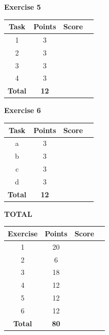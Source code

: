\documentclass [11pt, a4wide, twoside]{article}
\begin{document}
\noindent
\begin{minipage}[t]{120pt}

\vspace{1cm}

\textbf{Exercise 5}
\vspace{5pt}\\
\begin{tabular}{|c|c|c|c|}
\hline
Task & Points & Score \\\hline
1 & 3 & \\\hline
2 & 3 & \\\hline
3 & 3 & \\\hline
4 & 3 & \\\hline
\textbf{Total} & \textbf{12} &\\\hline\hline
\end{tabular}
\end{minipage}
\begin{minipage}[t]{120pt}
\vspace{1cm}

\textbf{Exercise 6}
\vspace{5pt}\\
\begin{tabular}{|c|c|c|c|}
\hline
Task & Points & Score \\\hline
a & 3 & \\\hline
b & 3 & \\\hline
c & 3 & \\\hline
d & 3 & \\\hline
\textbf{Total} & \textbf{12} &\\\hline\hline
\end{tabular}
\end{minipage}
\begin{minipage}[t]{120pt}
\vspace{1cm}

\textbf{TOTAL}
\vspace{5pt}\\
\begin{tabular}{|c|c|c|c|}
\hline
Exercise & Points & Score \\\hline
1 & 20 & \\\hline
2 & 6 & \\\hline
3 & 18 & \\\hline
4 & 12 & \\\hline
5 & 12 & \\\hline
6 & 12 & \\\hline
\textbf{Total} & \textbf{80} &\\\hline\hline
\end{tabular}
\end{minipage}
\end{document}

